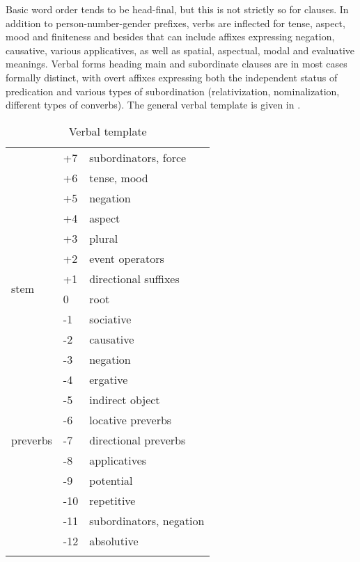\documentclass[output=paper]{langscibook}
\begin{document}
Basic word order tends to be head-final, but this is not strictly so for clauses. In addition to person-number-gender prefixes, verbs are inflected for tense, aspect, mood and finiteness and besides that can include affixes expressing negation, causative, various applicatives, as well as spatial, aspectual, modal and evaluative meanings. Verbal forms heading main and subordinate clauses are in most cases formally distinct, with overt affixes expressing both the independent status of predication and various types of subordination (relativization, nominalization, different types of converbs). The general verbal template is given in .


\begin{table}
    \centering
    \begin{tabularx}{0.6\textwidth}{p{1.3cm}p{0.5cm}p{3.8cm}}
    \lsptoprule
      \multirow{4}{*}{endings}  & +7 & subordinators, force   \\
        & +6 & tense, mood\\
        & +5 & negation\\
        & +4 & aspect\\
        \hline
       \multirow{6}{*}{stem}  & +3 & plural \\
        & +2 & event operators\\
        & +1 & directional suffixes\\
        & 0 & root\\
        & -1 & sociative\\
        & -2 & causative\\
        \hline
        & -3 & negation\\
        \hline
       \multirow{7}{*}{preverbs} & -4 & ergative  \\
        & -5 & indirect object\\
        & -6 & locative preverbs \\
        & -7 & directional preverbs \\
        & -8 & applicatives \\
        & -9 & potential \\
        & -10 & repetitive \\
        \hline
        & -11 & subordinators, negation \\
        & -12 & absolutive  \\
      \lspbottomrule  
    \end{tabularx}
    \caption{Verbal template}
    \label{tab:Arkadiev:1}
\end{table}
\end{document}
